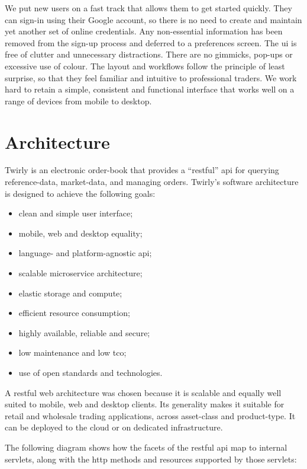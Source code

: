 \documentclass[11pt,a4paper]{article}
\newcommand{\twirly}{Twirly\cite{twirly}}
\begin{document}
We put new users on a fast track that allows them to get started quickly. They can sign-in using
their Google\cite{google} account, so there is no need to create and maintain yet another set of
online credentials. Any non-essential information has been removed from the sign-up process and
deferred to a preferences screen. The \gls{ui} is free of clutter and unnecessary
distractions. There are no gimmicks, pop-ups or excessive use of colour. The layout and workflows
follow the principle of least surprise, so that they feel familiar and intuitive to professional
traders. We work hard to retain a simple, consistent and functional interface that works well on a
range of devices from mobile to desktop.

\section{Architecture}

\twirly{} is an electronic \gls{order-book} that provides a ``\gls{restful}'' \gls{api} for querying
reference-data, \gls{market}-data, and managing \glspl{order}. Twirly's\cite{twirly} software
architecture is designed to achieve the following goals:

\begin{itemize}
\item clean and simple user interface;
\item mobile, \gls{web} and desktop equality;
\item language- and platform-agnostic \gls{api};
\item scalable \gls{microservice} architecture;
\item elastic storage and compute;
\item efficient resource consumption;
\item highly available, reliable and secure;
\item low maintenance and low \gls{tco};
\item use of open standards and technologies.
\end{itemize}

A \Gls{restful} \gls{web} architecture was chosen because it is scalable and equally well suited to
mobile, \gls{web} and desktop clients. Its generality makes it suitable for retail and wholesale
trading applications, across \gls{asset}-class and product-type. It can be deployed to the
\gls{cloud} or on dedicated infrastructure.

The following diagram shows how the facets of the \gls{restful} \gls{api} map to internal
\glspl{servlet}, along with the \gls{http} methods and resources supported by those \glspl{servlet}:
\end{document}
